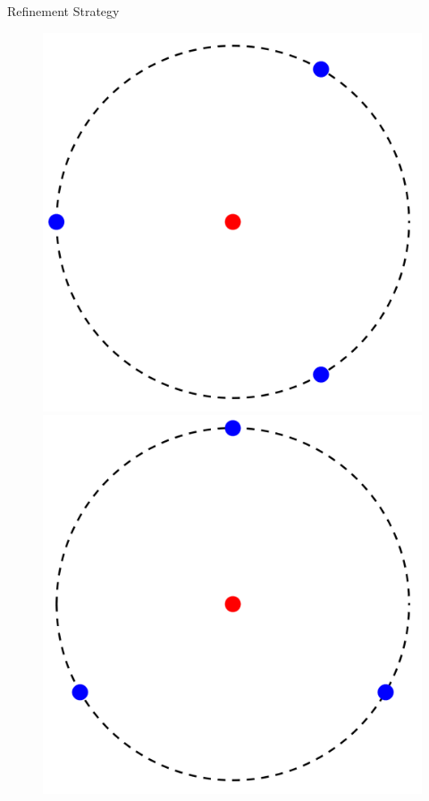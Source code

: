 \documentclass{beamer}
\begin{document}
\begin{frame}{Refinement Strategy}
\begin{itemize}
\begin{enumerate}
\begin{figure}[!htbp]
		  \includegraphics[scale=0.08]{./figures/2D3.png}
		  \includegraphics[scale=0.08]{./figures/2D4.png}
	\end{figure}
			\vspace{-0.3cm}

\end{enumerate}
\end{itemize}
\end{frame}
\end{document}
